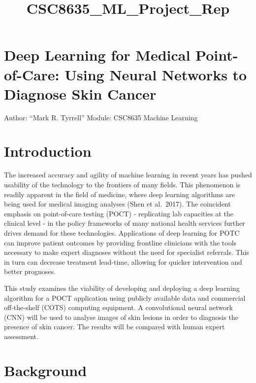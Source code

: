 \documentclass[11pt]{article}
\title{CSC8635\_ML\_Project\_Rep}
\begin{document}
    
    
    \maketitle
    
    

    
    \hypertarget{deep-learning-for-medical-point-of-care-using-neural-networks-to-diagnose-skin-cancer}{%
\section{Deep Learning for Medical Point-of-Care: Using Neural Networks
to Diagnose Skin
Cancer}\label{deep-learning-for-medical-point-of-care-using-neural-networks-to-diagnose-skin-cancer}}

Author: ``Mark R. Tyrrell'' Module: CSC8635 Machine Learning

    \hypertarget{introduction}{%
\section{Introduction}\label{introduction}}

The increased accuracy and agility of machine learning in recent years
has pushed usability of the technology to the frontiers of many fields.
This phenomenon is readily apparent in the field of medicine, where deep
learning algorithms are being used for medical imaging analyses (Shen et
al.~2017). The coincident emphasis on point-of-care testing (POCT) -
replicating lab capacities at the clinical level - in the policy
frameworks of many national health services further drives demand for
these technologies. Applications of deep learning for POTC can improve
patient outcomes by providing frontline clinicians with the tools
necessary to make expert diagnoses without the need for specialist
referrals. This in turn can decrease treatment lead-time, allowing for
quicker intervention and better prognoses.

This study examines the viability of developing and deploying a deep
learning algorithm for a POCT application using publicly available data
and commercial off-the-shelf (COTS) computing equipment. A convolutional
neural network (CNN) will be used to analyse images of skin lesions in
order to diagnosis the presence of skin cancer. The results will be
compared with human expert assessment.

\hypertarget{background}{%
\section{Background}\label{background}}
\end{document}
